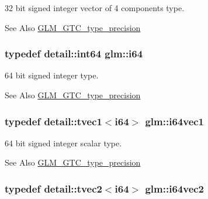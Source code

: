 32 bit signed integer vector of 4 components type. 

\begin{DoxySeeAlso}{See Also}
\hyperlink{group__gtc__type__precision}{G\-L\-M\-\_\-\-G\-T\-C\-\_\-type\-\_\-precision} 
\end{DoxySeeAlso}
\hypertarget{group__gtc__type__precision_gac7a7eaad46064fc952b06df33689da23}{
\subsubsection[{i64}]{\setlength{\rightskip}{0pt plus 5cm}typedef detail\-::int64 {\bf glm\-::i64}}}\label{group__gtc__type__precision_gac7a7eaad46064fc952b06df33689da23}


64 bit signed integer type. 

\begin{DoxySeeAlso}{See Also}
\hyperlink{group__gtc__type__precision}{G\-L\-M\-\_\-\-G\-T\-C\-\_\-type\-\_\-precision} 
\end{DoxySeeAlso}
\hypertarget{group__gtc__type__precision_ga1a81383845eb8991d3652848249edeb8}{
\subsubsection[{i64vec1}]{\setlength{\rightskip}{0pt plus 5cm}typedef detail\-::tvec1$<$i64$>$ {\bf glm\-::i64vec1}}}\label{group__gtc__type__precision_ga1a81383845eb8991d3652848249edeb8}


64 bit signed integer scalar type. 

\begin{DoxySeeAlso}{See Also}
\hyperlink{group__gtc__type__precision}{G\-L\-M\-\_\-\-G\-T\-C\-\_\-type\-\_\-precision} 
\end{DoxySeeAlso}
\hypertarget{group__gtc__type__precision_ga8887703a36c5ef093b74abd9e4640c79}{
\subsubsection[{i64vec2}]{\setlength{\rightskip}{0pt plus 5cm}typedef detail\-::tvec2$<$i64$>$ {\bf glm\-::i64vec2}}}\label{group__gtc__type__precision_ga8887703a36c5ef093b74abd9e4640c79}


